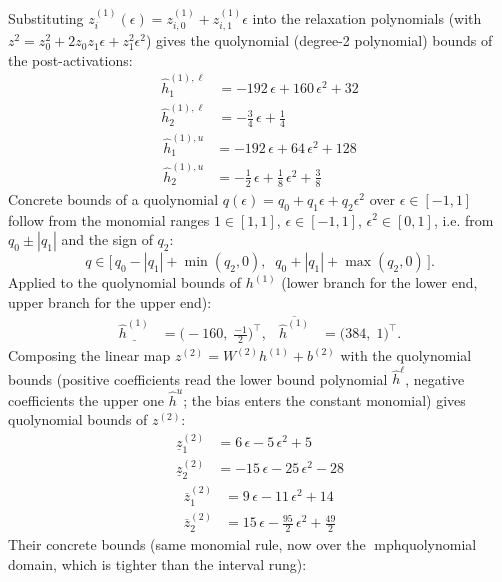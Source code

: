\documentclass[11pt]{article}
\begin{document}
Substituting $z^{(1)}_i(\epsilon) = z^{(1)}_{i,0} + z^{(1)}_{i,1} \epsilon$ into the relaxation
polynomials (with $z^2 = z_0^2 + 2 z_0 z_1 \epsilon + z_1^2 \epsilon^2$) gives the quolynomial
(degree-2 polynomial) bounds of the post-activations:
\begin{align*}
\hat{h}^{(1),\ell}_{1} &= -192\,\epsilon + 160\,\epsilon^2 + 32 \\
\hat{h}^{(1),\ell}_{2} &= -\frac{3}{4}\,\epsilon + \frac{1}{4}
\end{align*}
\begin{align*}
\hat{h}^{(1),u}_{1} &= -192\,\epsilon + 64\,\epsilon^2 + 128 \\
\hat{h}^{(1),u}_{2} &= -\frac{1}{2}\,\epsilon + \frac{1}{8}\,\epsilon^2 + \frac{3}{8}
\end{align*}
Concrete bounds of a quolynomial $q(\epsilon) = q_0 + q_1 \epsilon + q_2 \epsilon^2$ over
$\epsilon \in [-1, 1]$ follow from the monomial ranges $1 \in [1, 1]$, $\epsilon \in [-1, 1]$,
$\epsilon^2 \in [0, 1]$, i.e. from $q_0 \pm |q_1|$ and the sign of $q_2$:
\begin{equation*}
q \in \bigl[\, q_0 - |q_1| + \min(q_2, 0), \;\; q_0 + |q_1| + \max(q_2, 0) \,\bigr].
\end{equation*}
Applied to the quolynomial bounds of $h^{(1)}$ (lower branch for the lower end, upper branch for the upper end):
\begin{align*}
\underline{\hat{h}^{(1)}} &= \bigl(-160,\; \frac{-1}{2}\bigr)^{\!\top}, & \overline{\hat{h}^{(1)}} &= \bigl(384,\; 1\bigr)^{\!\top}.
\end{align*}
Composing the linear map $z^{(2)} = W^{(2)} h^{(1)} + b^{(2)}$ with the quolynomial bounds
(positive coefficients read the lower bound polynomial $\hat{h}^{\ell}$, negative coefficients the
upper one $\hat{h}^{u}$; the bias enters the constant monomial) gives quolynomial bounds of
$z^{(2)}$:
\begin{align*}
\underline{z}^{(2)}_{1} &= 6\,\epsilon - 5\,\epsilon^2 + 5 \\
\underline{z}^{(2)}_{2} &= -15\,\epsilon - 25\,\epsilon^2 - 28
\end{align*}
\begin{align*}
\overline{z}^{(2)}_{1} &= 9\,\epsilon - 11\,\epsilon^2 + 14 \\
\overline{z}^{(2)}_{2} &= 15\,\epsilon - \frac{95}{2}\,\epsilon^2 + \frac{49}{2}
\end{align*}
Their concrete bounds (same monomial rule, now over the mph{quolynomial} domain, which is tighter than the interval rung):
\end{document}
